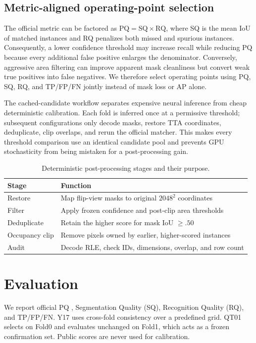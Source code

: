 \documentclass[sigconf]{acmart}
\begin{document}
\subsection{Metric-aligned operating-point selection}
The official metric can be factored as $\mathrm{PQ}=\mathrm{SQ}\times\mathrm{RQ}$, where SQ is the
mean IoU of matched instances and RQ penalizes both missed and spurious instances. Consequently, a
lower confidence threshold may increase recall while reducing PQ because every additional false
positive enlarges the denominator. Conversely, aggressive area filtering can improve apparent mask
cleanliness but convert weak true positives into false negatives. We therefore select operating
points using PQ, SQ, RQ, and TP/FP/FN jointly instead of mask loss or AP alone.

The cached-candidate workflow separates expensive neural inference from cheap deterministic
calibration. Each fold is inferred once at a permissive threshold; subsequent configurations only
decode masks, restore TTA coordinates, deduplicate, clip overlaps, and rerun the official matcher.
This makes every threshold comparison use an identical candidate pool and prevents GPU stochasticity
from being mistaken for a post-processing gain.

\begin{table}[!h]
\centering
\caption{Deterministic post-processing stages and their purpose.}
\label{tab:postprocess}
\small
\begin{tabularx}{\columnwidth}{lX}
\toprule
Stage & Function \\
\midrule
Restore & Map flip-view masks to original $2048^2$ coordinates \\
Filter & Apply frozen confidence and post-clip area thresholds \\
Deduplicate & Retain the higher score for mask IoU $\geq .50$ \\
Occupancy clip & Remove pixels owned by earlier, higher-scored instances \\
Audit & Decode RLE, check IDs, dimensions, overlap, and row count \\
\bottomrule
\end{tabularx}
\end{table}

\section{Evaluation}\label{sec:evaluation}
We report official PQ \cite{kirillov2019panoptic}, Segmentation Quality (SQ), Recognition Quality
(RQ), and TP/FP/FN. Y17 uses cross-fold consistency over a predefined grid. QT01 selects on Fold0
and evaluates unchanged on Fold1, which acts as a frozen confirmation set. Public scores are never
used for calibration.
\end{document}
